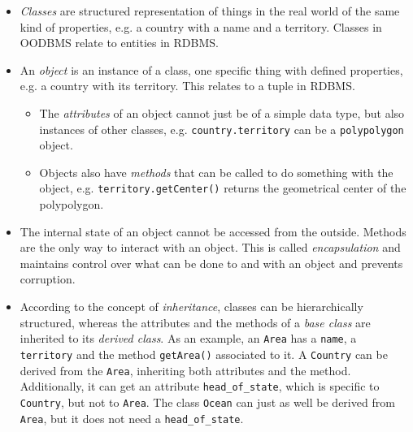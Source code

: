 \begin{itemize}
  \item \emph{Classes} are structured representation of things in the real world of the same kind of properties, e.g. a country with a name and a territory. Classes in OODBMS relate to entities in RDBMS.
  \item An \emph{object} is an instance of a class, one specific thing with defined properties, e.g. a country with its territory. This relates to a tuple in RDBMS.
  \begin{itemize}
    \item The \emph{attributes} of an object cannot just be of a simple data type, but also instances of other classes, e.g. \texttt{country.territory} can be a \texttt{polypolygon} object.
    \item Objects also have \emph{methods} that can be called to do something with the object, e.g. \texttt{territory.getCenter()} returns the geometrical center of the polypolygon.
  \end{itemize}
  \item The internal state of an object cannot be accessed from the outside. Methods are the only way to interact with an object. This is called \emph{encapsulation} and maintains control over what can be done to and with an object and prevents corruption.
  \item According to the concept of \emph{inheritance}, classes can be hierarchically structured, whereas the attributes and the methods of a \emph{base class} are inherited to its \emph{derived class}. As an example, an \texttt{Area} has a \texttt{name}, a \texttt{territory} and the method \texttt{getArea()} associated to it. A \texttt{Country} can be derived from the \texttt{Area}, inheriting both attributes and the method. Additionally, it can get an attribute \texttt{head\_of\_state}, which is specific to \texttt{Country}, but not to \texttt{Area}. The class \texttt{Ocean} can just as well be derived from \texttt{Area}, but it does not need a \texttt{head\_of\_state}.
\end{itemize}

